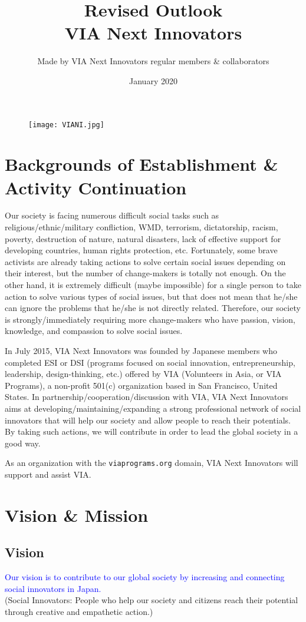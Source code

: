 \documentclass[dvipdfmx]{article}
\title{Revised Outlook\\
VIA Next Innovators}
\author{Made by VIA Next Innovators regular members \& collaborators}
\date{January 2020}
\begin{document}
\maketitle
\newpage
\tableofcontents
\vspace{20truept}
\begin{figure}[h]
\texttt{[image: VIANI.jpg]}
\end{figure}
\newpage
\section{Backgrounds of Establishment \& Activity Continuation}
Our society is facing numerous difficult social tasks such as religious/ethnic/military confliction, WMD, terrorism, dictatorship, racism, poverty, destruction of nature, natural disasters, lack of effective support for developing countries, human rights protection, etc. Fortunately, some brave activists are already taking actions to solve certain social issues depending on their interest, but the number of change-makers is totally not enough. On the other hand, it is extremely difficult (maybe impossible) for a single person to take action to solve various types of social issues, but that does not mean that he/she can ignore the problems that he/she is not directly related. Therefore, our society is strongly/immediately requiring more change-makers who have passion, vision, knowledge, and compassion to solve social issues.
\par
In July 2015, VIA Next Innovators was founded by Japanese members who completed ESI or DSI (programs focused on social innovation\cite{open,new}, entrepreneurship\cite{social,text,ie,dm}, leadership\cite{lesson,syn}, design-thinking\cite{how,why,research}, etc.) offered by VIA (Volunteers in Asia, or VIA Programs), a non-profit 501(c) organization based in San Francisco, United States. In partnership/cooperation/discussion with VIA, VIA Next Innovators aims at developing/maintaining/expanding a strong professional network of social innovators that will help our society and allow people to reach their potentials. By taking such actions, we will contribute in order to lead the global society in a good way.
\par
As an organization with the \texttt{viaprograms.org} domain, VIA Next Innovators will support and assist VIA.
\section{Vision \& Mission}
\subsection{Vision}
\textcolor{blue}{Our vision is to contribute to our global society by increasing and connecting social innovators in Japan.}\\
(Social Innovators: People who help our society and citizens reach their potential through creative and empathetic action.)
\end{document}
